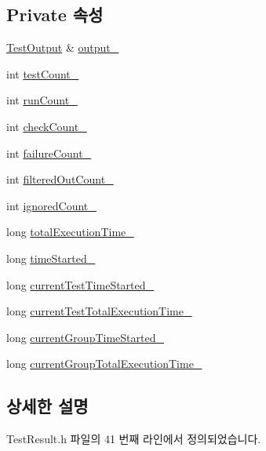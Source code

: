 \subsection*{Private 속성}
\begin{DoxyCompactItemize}
\item 
\hyperlink{class_test_output}{Test\+Output} \& \hyperlink{class_test_result_ac3a8d866a9a5666377f4b37771255ff1}{output\+\_\+}
\item 
int \hyperlink{class_test_result_ace881ee661bae3d8b8d63b6888f80a36}{test\+Count\+\_\+}
\item 
int \hyperlink{class_test_result_a12d866d171e7cdbda3f2720d559d7d78}{run\+Count\+\_\+}
\item 
int \hyperlink{class_test_result_a50ee7523f38c3e4845847d4f155c09f8}{check\+Count\+\_\+}
\item 
int \hyperlink{class_test_result_a006a6550e4e3d4de173c35b50c1c90b0}{failure\+Count\+\_\+}
\item 
int \hyperlink{class_test_result_a248db91e883a63c01979bd4061c9d09a}{filtered\+Out\+Count\+\_\+}
\item 
int \hyperlink{class_test_result_a2b7730405ef24d65a7aa54d40213e28f}{ignored\+Count\+\_\+}
\item 
long \hyperlink{class_test_result_ae617e59ed28cde2b6d69c8e0143a839b}{total\+Execution\+Time\+\_\+}
\item 
long \hyperlink{class_test_result_a388eb648c1723943446ff1de3595b10b}{time\+Started\+\_\+}
\item 
long \hyperlink{class_test_result_a436d2703869b654578b90237c2e7b6b7}{current\+Test\+Time\+Started\+\_\+}
\item 
long \hyperlink{class_test_result_a760d835a5174afcf6c0d1a08d2a75124}{current\+Test\+Total\+Execution\+Time\+\_\+}
\item 
long \hyperlink{class_test_result_aa9b1fed3dedb9610f6703333d8e62ec9}{current\+Group\+Time\+Started\+\_\+}
\item 
long \hyperlink{class_test_result_affeb08a81fa11df1befb80894f2609ed}{current\+Group\+Total\+Execution\+Time\+\_\+}
\end{DoxyCompactItemize}


\subsection{상세한 설명}


Test\+Result.\+h 파일의 41 번째 라인에서 정의되었습니다.



